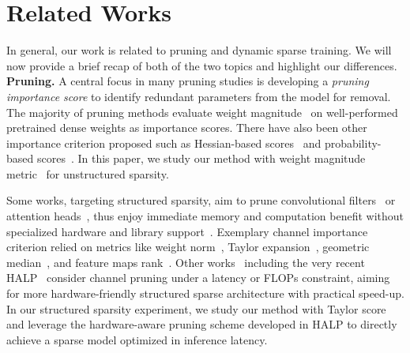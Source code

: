 \section{Related Works}
\label{sec:related}
In general, our work is related to pruning and dynamic sparse training. We will now provide a brief recap of both of the two topics and highlight our differences.\\
\textbf{Pruning.}
A central focus in many pruning studies is developing a \emph{pruning importance score} to identify redundant parameters from the model for removal. The majority of pruning methods evaluate weight magnitude~\cite{thimm1995evaluating, strom1997sparse,han2015deep, narang2017exploring,zhu2017prune,gale2019state} on well-performed pretrained dense weights as importance scores. 
There have also been other importance criterion proposed such as Hessian-based scores~\cite{lecun1990optimal, hassibi1992second} and probability-based scores~\cite{zhou2021effective, srinivas2017training, molchanov2017variational}. In this paper, we study our method with weight magnitude metric~\cite{han2015deep} for unstructured sparsity. 

Some works, targeting structured sparsity, aim to prune convolutional filters~\cite{li2017pruning} or attention heads~\cite{michel2019sixteen}, thus enjoy immediate memory and computation benefit without specialized hardware and library support~\cite{han2016eie}. Exemplary channel importance criterion relied on metrics like weight norm~\cite{li2017pruning, chin2020towards, he2020learning, he2018soft, yang2018netadapt, sun2024towards}, Taylor expansion~\cite{lin2018accelerating, molchanov2019importance, you2019gate}, geometric median~\cite{he2019filter}, and feature maps rank~\cite{lin2020hrank}. Other works~\cite{chen2018constraint, shen2021halp, shen2023hardware} including the very recent HALP~\cite{shen2021halp} consider channel pruning under a latency or FLOPs constraint, aiming for more hardware-friendly structured sparse architecture with practical speed-up. In our structured sparsity experiment, we study our method with Taylor score~\cite{molchanov2019importance} and leverage the hardware-aware pruning scheme developed in HALP to directly achieve a sparse model optimized in inference latency.


